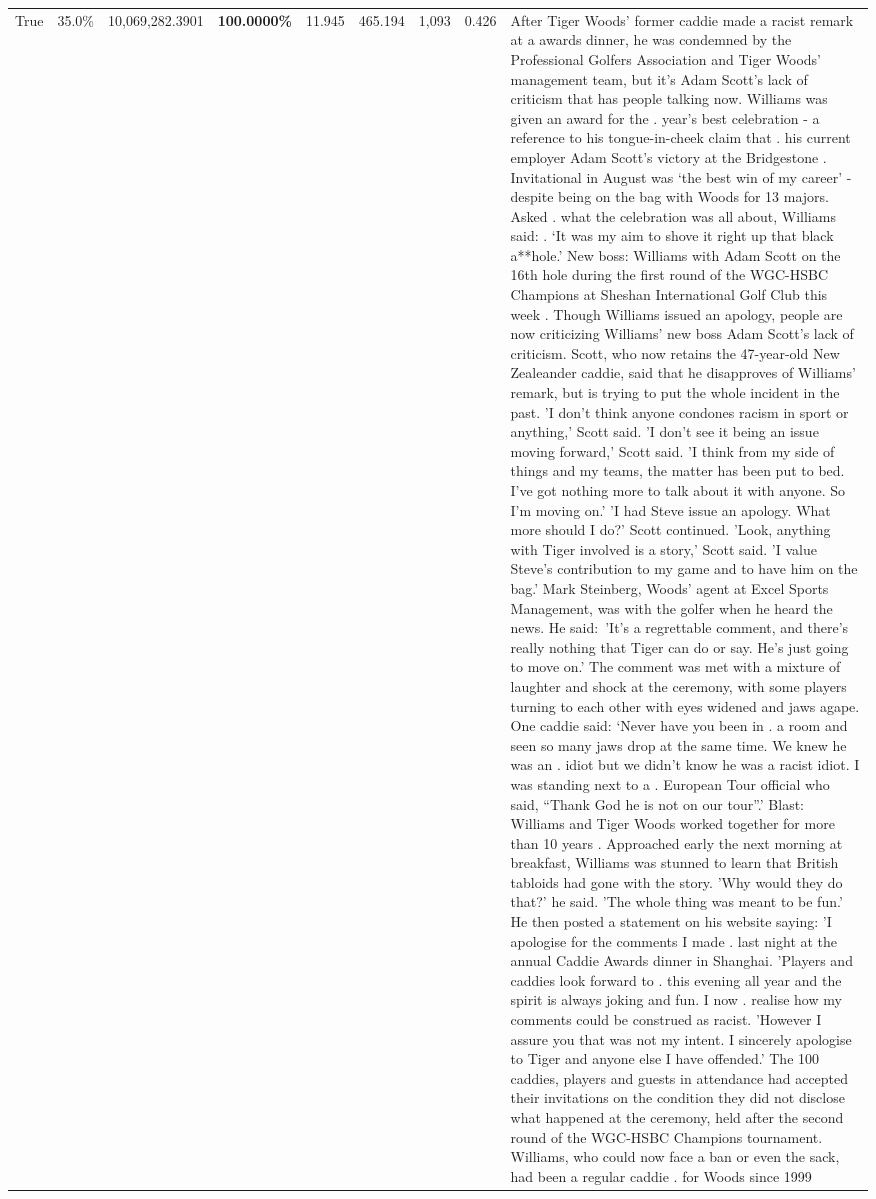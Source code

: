 \begin{table}[H]
\begin{tabular}{lllrlllll}
True & 35.0\% & 10,069,282.3901 & \bfseries \color{red} 100.0000\% & 11.945 & 465.194 & 1,093 & 0.426 & After Tiger Woods' former caddie made a racist remark at a awards dinner, he was condemned by the Professional Golfers Association and Tiger Woods' management team, but it's Adam Scott's lack of criticism that has people talking now. Williams was given an award for the . year’s best celebration - a reference to his tongue-in-cheek claim that . his current employer Adam Scott’s victory at the Bridgestone . Invitational in August was ‘the best win of my career’ - despite being on the bag with Woods for 13 majors. Asked . what the celebration was all about, Williams said: . ‘It was my aim to shove it right up that black a**hole.’ New boss: Williams with Adam Scott  on the 16th hole during the first round of the WGC-HSBC Champions at Sheshan International Golf Club this week . Though Williams issued an apology, people are now criticizing Williams' new boss Adam Scott's lack of criticism. Scott, who now retains the 47-year-old New Zealeander caddie, said that he disapproves of Williams' remark, but is trying to put the whole incident in the past. 'I don't think anyone condones racism in sport or anything,' Scott said. 'I don't see it being an issue moving forward,' Scott said. 'I think from my side of things and my teams, the matter has been put to bed. I've got nothing more to talk about it with anyone. So I'm moving on.' 'I had Steve issue an apology. What more should I do?' Scott continued. 'Look, anything with Tiger involved is a story,' Scott said. 'I value Steve's contribution to my game and to have him on the bag.' Mark Steinberg, Woods' agent at Excel Sports Management, was with the golfer when he heard the news. He said: 'It's a regrettable comment, and there's really nothing that Tiger can do or say. He's just going to move on.' The comment was met with a mixture of laughter and shock at the ceremony, with some players turning to each other with eyes widened and jaws agape. One caddie said: ‘Never have you been in . a room and seen so many jaws drop at the same time. We knew he was an . idiot but we didn’t know he was a racist idiot. I was standing next to a . European Tour official who said, “Thank God he is not on our tour”.’ Blast: Williams and Tiger Woods worked together for more than 10 years . Approached early the next morning at breakfast, Williams was stunned to learn that British tabloids had gone with the story. 'Why would they do that?' he said. 'The whole thing was meant to be fun.' He then posted a statement on his website saying: 'I apologise for the comments I made . last night at the annual Caddie Awards dinner in Shanghai. 'Players and caddies look forward to . this evening all year and the spirit is always joking and fun. I now . realise how my comments could be construed as racist. 'However I assure you that was not my intent. I sincerely apologise to Tiger and anyone else I have offended.' The 100 caddies, players and guests in attendance had accepted their invitations on the condition they did not disclose what happened at the ceremony, held after the second round of the WGC-HSBC Champions tournament. Williams, who could now face a ban or even the sack, had been a regular caddie . for Woods since 1999 
\end{tabular}
\end{table}
